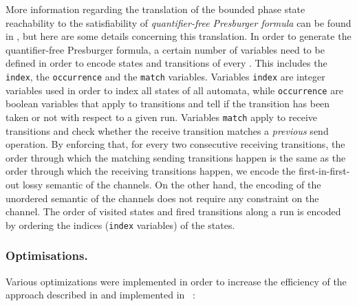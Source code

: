 More information regarding the translation of the bounded phase state reachability to the satisfiability of \emph{quantifier-free Presburger formula} can be found in \cite{AAC13}, but here are some details concerning this translation.
%
In order to generate the quantifier-free Presburger formula,
a certain number of variables need to be defined in order to encode states and transitions of every \Nfa.
%
This includes the \texttt{index}, the \texttt{occurrence} and the \texttt{match} variables.
%
Variables \texttt{index} are integer variables used in order to index all states of all automata,
while \texttt{occurrence} are boolean variables that apply to transitions and tell if the transition has been taken or not with respect to a given run.
%
Variables \texttt{match} apply to receive transitions and check whether the receive transition matches a \textit{previous} send operation.
%
By enforcing that, for every two consecutive receiving transitions,
the order through which the matching sending transitions happen is the same
as the order through which the receiving transitions happen, we encode the first-in-first-out lossy semantic of the channels.
%
On the other hand, the encoding of the unordered semantic of the channels does not require any
constraint on the channel.
%
The order of visited states and fired transitions along a run is encoded by ordering the indices (\texttt{index} variables) of the states.



\subsubsection*{Optimisations.}
Various optimizations were implemented in order to increase the efficiency of the approach described in  \cite{AAC13} and implemented in \alternator\ \cite{github.alternator}:

